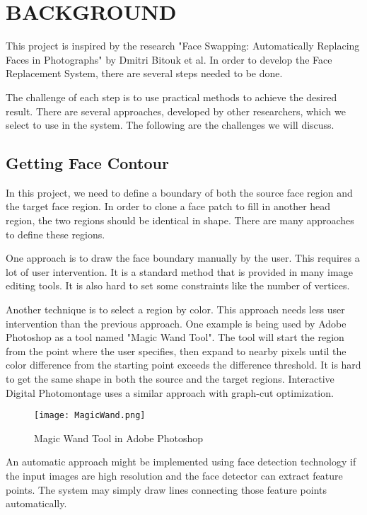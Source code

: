 \chapter{BACKGROUND}\label{chap:BACKGROUND}
\hspace{0.5in}This project is inspired by the research "Face Swapping: Automatically Replacing Faces in Photographs" by Dmitri Bitouk et al\cite{Bitouk2008}. In order to develop the Face Replacement System, there are several steps needed to be done.

The challenge of each step is to use practical methods to achieve the desired result. There are several approaches, developed by other researchers, which we select to use in the system. The following are the challenges we will discuss.

\section{Getting Face Contour}
\hspace{0.5in}In this project, we need to define a boundary of both the source face region and the target face region. In order to clone a face patch to fill in another head region, the two regions should be identical in shape. There are many approaches to define these regions.

One approach is to draw the face boundary manually by the user. This requires a lot of user intervention. It is a standard method that is provided in many image editing tools. It is also hard to set some constraints like the number of vertices.

Another technique is to select a region by color. This approach needs less user intervention than the previous approach. One example is being used by Adobe Photoshop as a tool named "Magic Wand Tool". The tool will start the region from the point where the user specifies, then expand to nearby pixels until the color difference from the starting point exceeds the difference threshold. It is hard to get the same shape in both the source and the target regions. Interactive Digital Photomontage \cite{Agarwala2004} uses a similar approach with graph-cut optimization.

\begin{figure}[htb]
   \centering
   \texttt{[image: MagicWand.png]}
   \caption{Magic Wand Tool in Adobe Photoshop}
   \label{fig:MagicWand}
\end{figure}

An automatic approach might be implemented using face detection technology if the input images are high resolution and the face detector can extract feature points. The system may simply draw lines connecting those feature points automatically.

